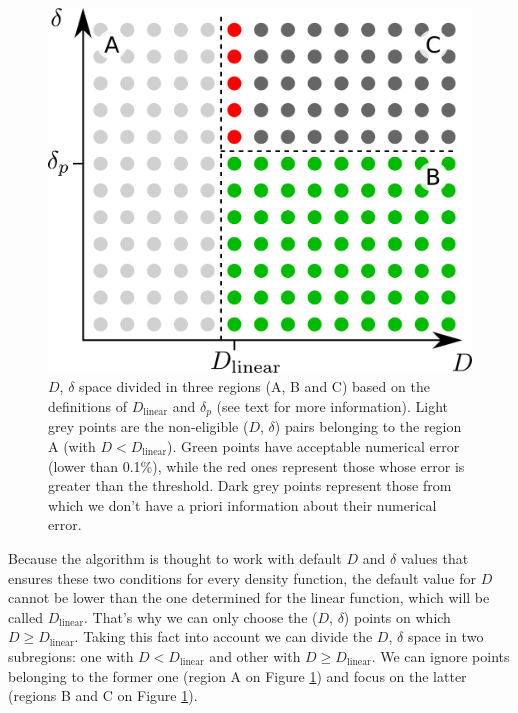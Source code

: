 \documentclass[extra]{gji}
\begin{document}
\begin{figure}
\centering
\includegraphics[width=\linewidth]
    {figures/D-delta-grid-search.pdf}
\caption{
    $D$, $\delta$ space divided in three regions (A, B and C) based on 
    the definitions of $D_\text{linear}$ and $\delta_p$ (see text for more 
    information).
    Light grey points are the non-eligible ($D$, $\delta$) pairs 
    belonging to the region A (with $D < D_\text{linear}$).
    Green points have acceptable numerical error (lower than 0.1\%), 
    while the red ones represent those whose error is greater than the 
    threshold.
    Dark grey points represent those from which we don't have a priori 
    information about their numerical error.}
\label{fig:D-delta-grid-search}
\end{figure}

Because the algorithm is thought to work with default $D$ and $\delta$ 
values that ensures these two conditions for every density function, 
the default value for $D$ cannot be lower than the one determined for 
the linear function, which will be called $D_\text{linear}$.
That's why we can only choose the ($D$, $\delta$) points on which
$D \geq D_\text{linear}$.
Taking this fact into account we can divide the $D$, $\delta$ space in 
two subregions: one with $D < D_\text{linear}$ and other with $D \ge 
D_\text{linear}$. We can ignore points belonging to the former one 
(region A on Figure \ref{fig:D-delta-grid-search}) and focus on the 
latter (regions B and C on Figure \ref{fig:D-delta-grid-search}).
\end{document}
